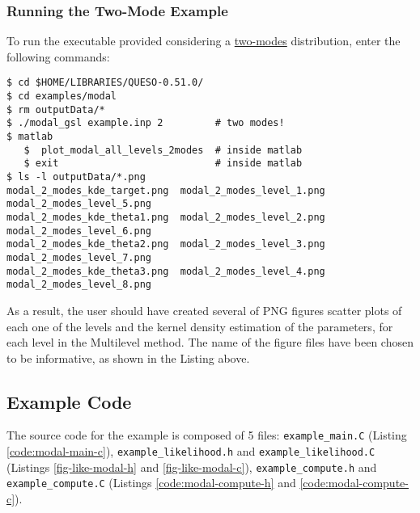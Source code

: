 \subsubsection{Running the Two-Mode Example}
 
To run the executable provided considering a \underline{two-modes} distribution, enter the following commands:
\begin{lstlisting}[label={},caption={Running the example with a two-mode distribution.}]
$ cd $HOME/LIBRARIES/QUESO-0.51.0/
$ cd examples/modal
$ rm outputData/*
$ ./modal_gsl example.inp 2         # two modes!
$ matlab
   $  plot_modal_all_levels_2modes  # inside matlab
   $ exit                           # inside matlab
$ ls -l outputData/*.png
modal_2_modes_kde_target.png  modal_2_modes_level_1.png  modal_2_modes_level_5.png
modal_2_modes_kde_theta1.png  modal_2_modes_level_2.png  modal_2_modes_level_6.png
modal_2_modes_kde_theta2.png  modal_2_modes_level_3.png  modal_2_modes_level_7.png
modal_2_modes_kde_theta3.png  modal_2_modes_level_4.png  modal_2_modes_level_8.png
\end{lstlisting}

As a result, the user should have created several of PNG figures scatter plots of each one of the levels and the kernel density estimation of the parameters, for each level in the Multilevel method. The name of the figure files have been chosen to be informative, as shown in the Listing above. 



\subsection{Example Code}\label{sec:modal-code}

The source code for the example is composed of 5 files:
\texttt{example\_main.C} (Listing \ref{code:modal-main-c}), \linebreak
\texttt{example\_likelihood.h} and \texttt{example\_likelihood.C} (Listings \ref{fig-like-modal-h} and \ref{fig-like-modal-c}),
\texttt{example\_compute.h} and \texttt{example\_compute.C} (Listings \ref{code:modal-compute-h} and \ref{code:modal-compute-c}).






